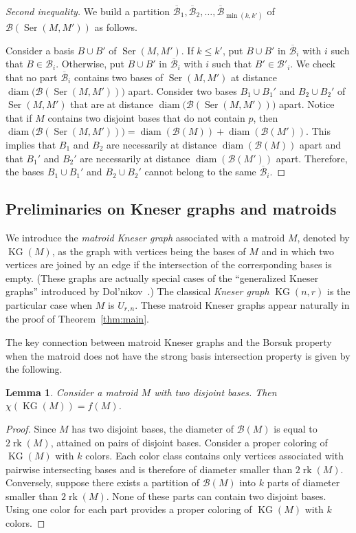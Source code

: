 \documentclass[12pt]{amsart}
\theoremstyle{plain}
\newtheorem{lemma}[theorem]{Lemma}
\theoremstyle{definition}
\theoremstyle{remark}
\renewcommand{\leq}{\leqslant}
\newcommand{\diame}{\mathsf{diam}}
\newcommand{\Ser}{\operatorname{Ser}}
\newcommand{\rk}{\operatorname{rk}}
\def \KG {\operatorname{KG}}
\def \diame {\operatorname{diam}}
\def \B {\mathcal{B}}
\begin{document}
\begin{proof}
[Second inequality] We build a partition $\overline{\B}_1,\overline{\B}_2,\ldots,\overline{\B}_{\min(k,k')}$ of $\B(\Ser(M,M'))$ as follows.

Consider a basis $B \cup B'$ of $\Ser(M,M')$. If $k \leq k'$, put $B \cup B'$ in $\overline{\B}_i$ with $i$ such that $B \in \B_i$. Otherwise, put $B \cup B'$ in $\overline{\B}_i$ with $i$ such that $B' \in \B'_i$. We check that no part $\overline{\B}_i$ contains two bases of $\Ser(M,M')$ at distance $\diame\bigl(\B(\Ser(M,M'))\bigr)$ apart. Consider two bases $B_1 \cup B_1'$ and $B_2\cup B_2'$ of $\Ser(M,M')$ that are at distance $\diame\bigl(\B(\Ser(M,M'))\bigr)$ apart. Notice that if $M$ contains two disjoint bases that do not contain $p$, then $\diame\bigl(\B(\Ser(M,M'))\bigr) = \diame(\B(M)) + \diame(\B(M'))$. This implies that $B_1$ and $B_2$ are necessarily at distance $\diame(\B(M))$ apart and that $B_1'$ and $B_2'$ are necessarily at distance $\diame(\B(M'))$ apart. Therefore, the bases $B_1 \cup B_1'$ and $B_2 \cup B_2'$ cannot belong to the same $\overline{\B}_i$.
\end{proof}


\subsection{Preliminaries on Kneser graphs and matroids}

We introduce the {\em matroid Kneser graph} associated with a matroid $M$, denoted by $\KG(M)$, as the graph with
vertices being the bases of $M$ and in which two vertices are joined by an edge if the intersection of the
corresponding bases is empty. (These graphs are actually special cases of the ``generalized Kneser graphs'' introduced by Dol'nikov~\cite{dol1988certain}.) The classical {\em Kneser graph} $\KG(n, r)$ is the particular case when
$M$ is $U_{r,n}$. These matroid Kneser graphs appear naturally in the proof of Theorem~\ref{thm:main}.

The key connection between matroid Kneser graphs and the Borsuk property when the matroid does not have the strong basis intersection property is given by the following.

\begin{lemma}\label{lem:kneser}
Consider a matroid $M$ with two disjoint bases. Then $\chi(\KG(M)) = f(M)$.
\end{lemma}

\begin{proof}
Since $M$ has two disjoint bases, the diameter of $\B(M)$ is equal to $2\rk(M)$, attained on pairs of disjoint bases. Consider a proper coloring of $\KG(M)$ with $k$ colors. Each color class contains only vertices associated with pairwise intersecting bases and is therefore of diameter smaller than $2\rk(M)$. Conversely, suppose there exists a partition of $\B(M)$ into $k$ parts of diameter smaller than $2\rk(M)$. None of these parts can contain two  disjoint bases. Using one color for each part provides a proper coloring of $\KG(M)$ with $k$ colors.
\end{proof}
\end{document}
